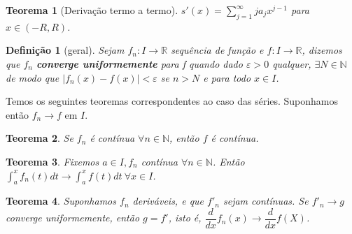 \documentclass[12pt]{article}
\newtheorem{theorem}{Teorema}[section]
\newtheorem{definition}{Definição}
\begin{document}
\begin{theorem}[Derivação termo a termo]
    $s'(x) = \sum_{j=1}^\infty j a_j x^{j-1}$ para $x \in (-R, R)$.
\end{theorem}

\begin{definition}[geral]
    Sejam $f_n: I \rightarrow{} \mathbb{R}$ sequência de função e $f: I \rightarrow{} \mathbb{R}$, dizemos que $f_n$ \textbf{converge uniformemente} para f quando dado $\varepsilon > 0$ qualquer, $\exists N \in \mathbb{N}$ de modo que $|f_n(x) - f(x)| < \varepsilon$ se $n > N$ e para todo $x \in I$.
\end{definition}

Temos os seguintes teoremas correspondentes ao caso das séries. Suponhamos então $f_n \rightarrow{}f $ em $I$.

\begin{theorem}
    Se $f_n$ é contínua $\forall n \in \mathbb{N}$, então $f$ é contínua.
\end{theorem}

\begin{theorem}
    Fixemos $a \in I, f_n$ contínua $\forall n \in \mathbb{N}$. Então $\int_a^x f_n(t) d t \rightarrow{} \int_a^x f(t) d t \ \forall x \in I$. 
\end{theorem}

\begin{theorem}
    Suponhamos $f_n$ deriváveis, e que $f'_n$ sejam contínuas. Se $f'_n \rightarrow{} g$ converge uniformemente, então $g = f'$, isto é, $\dfrac{d}{d x} f_n(x) \rightarrow{} \dfrac{d}{d x} f(X)$.
\end{theorem}
\end{document}
